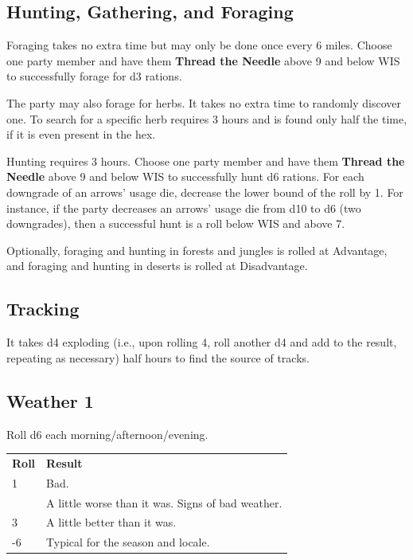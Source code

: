 \documentclass[twoside]{article}
\newcommand{\TTN}[2]{\textbf{Thread the Needle} above #1 and below #2}
\begin{document}
\subsection*{Hunting, Gathering, and Foraging}

Foraging takes no extra time but may only be done once every 6 miles. Choose one party member and have them \TTN{9}{WIS} to successfully forage for d3 rations.

\bigbreak

The party may also forage for herbs. It takes no extra time to randomly discover one. To search for a specific herb requires 3 hours and is found only half the time, if it is even present in the hex.

\bigbreak

Hunting requires 3 hours. Choose one party member and have them \TTN{9}{WIS} to successfully hunt d6 rations. For each downgrade of an arrows' usage die, decrease the lower bound of the roll by 1. For instance, if the party decreases an arrows' usage die from d10 to d6 (two downgrades), then a successful hunt is a roll below WIS and above 7.

\bigbreak

Optionally, foraging and hunting in forests and jungles is rolled at Advantage, and foraging and hunting in deserts is rolled at Disadvantage.

\subsection*{Tracking}

It takes d4 exploding (i.e., upon rolling 4, roll another d4 and add to the result, repeating as necessary) half hours to find the source of tracks.

\subsection*{Weather 1}

Roll d6 each morning/afternoon/evening.

\bigbreak

\begin{center}
\noindent\begin{tabular}{>{\centering\arraybackslash}p{}p{}}
\textbf{Roll}&\textbf{Result}\\
\rowcolor[gray]{0.75}1&Bad.\\
2&A little worse than it was. Signs of bad weather.\\
\rowcolor[gray]{0.75}3&A little better than it was.\\
4-6&Typical for the season and locale.\\
\end{tabular}
\end{center}
\end{document}
